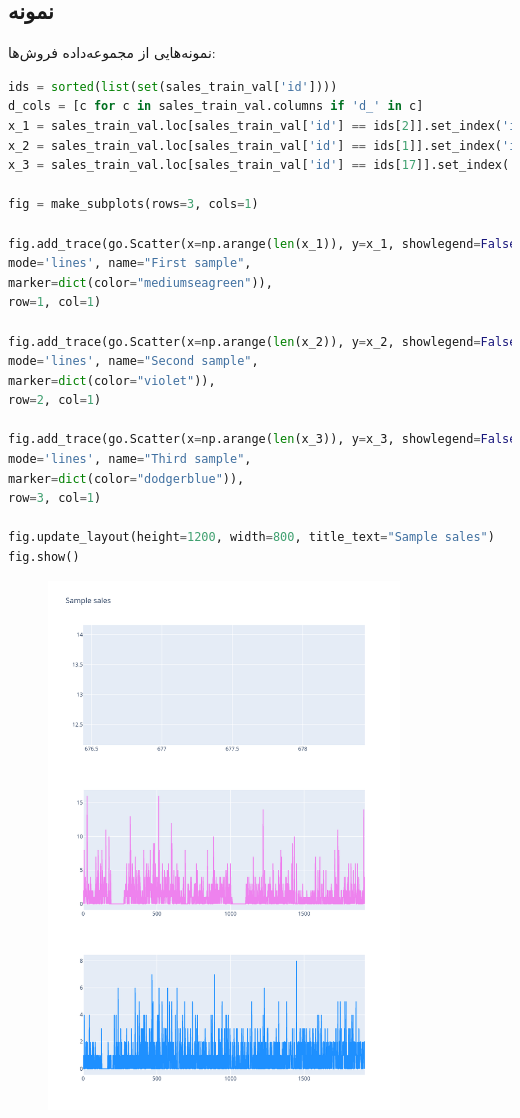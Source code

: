\documentclass{article}
\begin{document}
\subsection*{نمونه}
نمونه‌هایی از مجموعه‌داده فروش‌ها:
\begin{latin}
\begin{lstlisting}[language=Python]
ids = sorted(list(set(sales_train_val['id'])))
d_cols = [c for c in sales_train_val.columns if 'd_' in c]
x_1 = sales_train_val.loc[sales_train_val['id'] == ids[2]].set_index('id')[d_cols].values[0]
x_2 = sales_train_val.loc[sales_train_val['id'] == ids[1]].set_index('id')[d_cols].values[0]
x_3 = sales_train_val.loc[sales_train_val['id'] == ids[17]].set_index('id')[d_cols].values[0]

fig = make_subplots(rows=3, cols=1)

fig.add_trace(go.Scatter(x=np.arange(len(x_1)), y=x_1, showlegend=False,
mode='lines', name="First sample",
marker=dict(color="mediumseagreen")),
row=1, col=1)

fig.add_trace(go.Scatter(x=np.arange(len(x_2)), y=x_2, showlegend=False,
mode='lines', name="Second sample",
marker=dict(color="violet")),
row=2, col=1)

fig.add_trace(go.Scatter(x=np.arange(len(x_3)), y=x_3, showlegend=False,
mode='lines', name="Third sample",
marker=dict(color="dodgerblue")),
row=3, col=1)

fig.update_layout(height=1200, width=800, title_text="Sample sales")
fig.show()
\end{lstlisting}
\end{latin}
\pagebreak
\begin{figure}[hbt!]
	\centering
	\includegraphics[width=\textwidth,height=14cm]{Outputs/4.png}
\end{figure}
\end{document}
